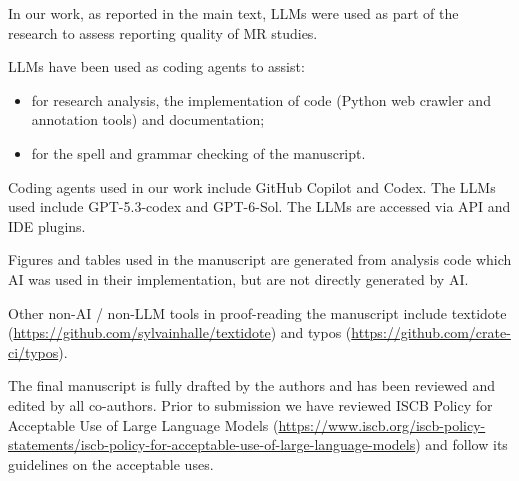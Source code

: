 
In our work, as reported in the main text, LLMs were used as part of the research to assess reporting quality of MR studies.

LLMs have been used as coding agents to assist:

\begin{itemize}
  \item for research analysis, the implementation of code (Python web crawler and annotation tools) and documentation;
  \item for the spell and grammar checking of the manuscript.
\end{itemize}

Coding agents used in our work include GitHub Copilot and Codex.
The LLMs used include GPT-5.3-codex and GPT-6-Sol.
The LLMs are accessed via API and IDE plugins.

Figures and tables used in the manuscript are generated from analysis code
which AI was used in their implementation, but are not directly generated by AI.

Other non-AI / non-LLM tools in proof-reading the manuscript include
textidote (\url{https://github.com/sylvainhalle/textidote}) and
typos (\url{https://github.com/crate-ci/typos}).

The final manuscript is fully drafted by the authors and has been reviewed and edited by all co-authors.
Prior to submission we have reviewed ISCB Policy for Acceptable Use of Large Language Models
(\url{https://www.iscb.org/iscb-policy-statements/iscb-policy-for-acceptable-use-of-large-language-models})
and follow its guidelines on the acceptable uses.

